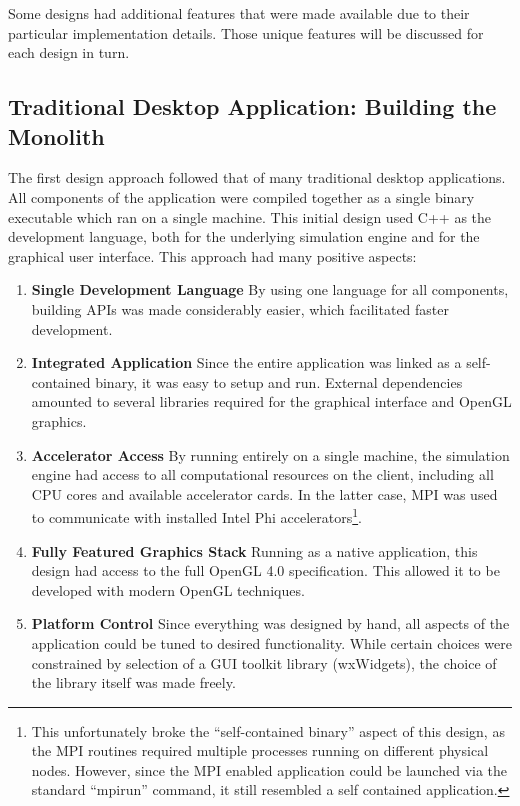   Some designs had additional features that were made available due
  to their particular implementation details. Those unique features
  will be discussed for each design in turn.

\subsection{Traditional Desktop Application: Building the Monolith}

The first design approach followed that of many traditional desktop
applications. All components of the application were compiled together
as a single binary executable which ran on a single machine. This
initial design used C++ as the development language, both for the
underlying simulation engine and for the graphical user
interface. This approach had many positive aspects:

\begin{enumerate}
  \item \textbf{Single Development Language} By using one language for
    all components, building APIs was made considerably easier, which
    facilitated faster development.

  \item \textbf{Integrated Application} Since the entire application
    was linked as a self-contained binary, it was easy to setup and
    run. External dependencies amounted to several libraries required
    for the graphical interface and OpenGL graphics.

  \item \textbf{Accelerator Access} By running entirely on a single
    machine, the simulation engine had access to all computational
    resources on the client, including all CPU cores and available
    accelerator cards. In the latter case, MPI was used to communicate
    with installed Intel Phi accelerators\footnote{This unfortunately
      broke the ``self-contained binary'' aspect of this design, as
      the MPI routines required multiple processes running on
      different physical nodes. However, since the MPI enabled
      application could be launched via the standard ``mpirun'' command, it
      still resembled a self contained application.}. 

   \item \textbf{Fully Featured Graphics Stack} Running as a native
     application, this design had access to the full OpenGL 4.0
     specification. This allowed it to be developed with modern OpenGL
     techniques.

   \item \textbf{Platform Control} Since everything was designed by
     hand, all aspects of the application could be tuned to desired
     functionality. While certain choices were constrained by
     selection of a GUI toolkit library (wxWidgets), the choice of the
     library itself was made freely.
    
\end{enumerate}

